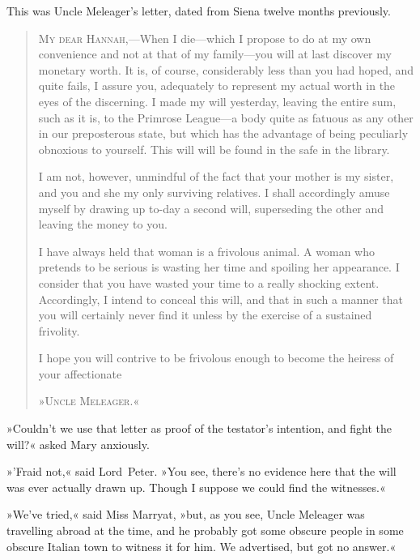 This was Uncle Meleager's letter, dated from Siena twelve months previously.

\makeatletter
{}
{%

}{%
	\enlargethispage{\baselineskip}
}
\makeatother

\begin{quotation}
\textsc{My dear Hannah,}—When I die—which I propose to do at my own convenience and not at that of my family—you will at last discover my monetary worth. It is, of course, considerably less than you had hoped, and quite fails, I assure you, adequately to represent my actual worth in the eyes of the discerning. I made my will yesterday, leaving the entire sum, such as it is, to the Primrose League—a body quite as fatuous as any other in our preposterous state, but which has the advantage of being peculiarly obnoxious to yourself. This will will be found in the safe in the library.

I am not, however, unmindful of the fact that your mother is my sister, and you and she my only surviving relatives. I shall accordingly amuse myself by drawing up to-day a second will, superseding the other and leaving the money to you.

I have always held that woman is a frivolous animal. A woman who pretends to be serious is wasting her time and spoiling her appearance. I consider that you have wasted your time to a really shocking extent. Accordingly, I intend to conceal this will, and that in such a manner that you will certainly never find it unless by the exercise of a sustained frivolity.

I hope you will contrive to be frivolous enough to become the heiress of your affectionate
\begin{flushright}
»\textsc{Uncle Meleager.}«
\end{flushright}
\end{quotation}

»Couldn't we use that letter as proof of the testator's intention, and fight the will?« asked Mary anxiously.

»'Fraid not,« said Lord~Peter. »You see, there's no evidence here that the will was ever actually drawn up. Though I suppose we could find the witnesses.«

»We've tried,« said Miss Marryat, »but, as you see, Uncle Meleager was travelling abroad at the time, and he probably got some obscure people in some obscure Italian town to witness it for him. We advertised, but got no answer.«

